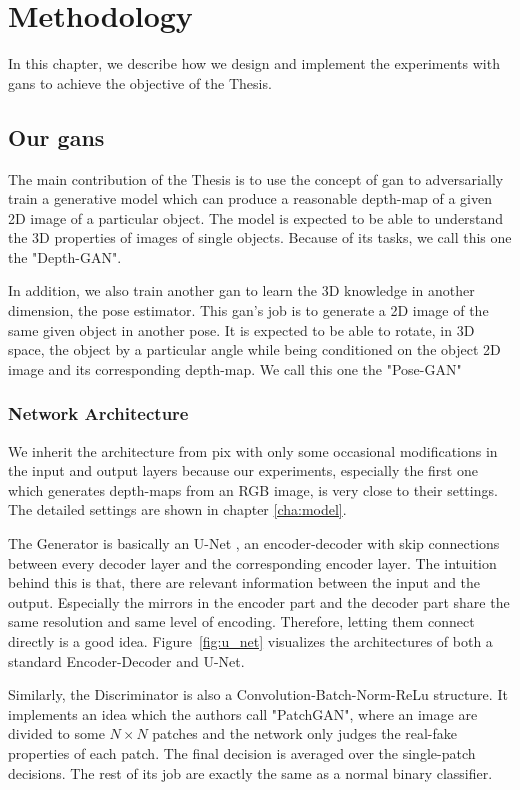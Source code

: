 \chapter{Methodology\label{cha:methodology}}
In this chapter, we describe how we design and implement the experiments with
\acrshort{gan}s to achieve the objective of the Thesis.

\section{Our \acrshort{gan}s }
The main contribution of the Thesis is to use the concept of \acrshort{gan} to
adversarially train a generative model which can produce a reasonable depth-map of a
given 2D image of a particular object. The model is expected to be able to
understand the 3D properties of images of single objects. Because of its tasks, we call
this one the "Depth-GAN".

In addition, we also train another \acrshort{gan} to learn the 3D knowledge in another
dimension, the pose estimator. This \acrshort{gan}'s job is to generate a 2D image of the
same given object in another pose. It is expected to be able to rotate, in 3D space, the
object by a particular angle while being conditioned on the object 2D image and its
corresponding depth-map. We call this one the "Pose-GAN"

\subsection{Network Architecture}

We inherit the architecture from \acrshort{pix} with only some occasional modifications in
the input and output layers because our experiments, especially the first one which
generates depth-maps from an RGB image, is very close to their settings. The detailed
settings are shown in chapter \ref{cha:model}.

The Generator is basically an U-Net \cite{u_net}, an encoder-decoder with skip
connections between every decoder layer and the corresponding encoder layer. The intuition
behind this is that, there are relevant information between the input and the output.
Especially the mirrors in the encoder part and the decoder part share the same resolution
and same level of encoding. Therefore, letting them connect directly is a good idea.
Figure~\ref{fig:u_net} visualizes the architectures of both a standard Encoder-Decoder and
U-Net.

Similarly, the Discriminator is also a Convolution-Batch-Norm-ReLu structure. It
implements an idea which the authors call "PatchGAN", where an image are divided to some
$N \times N$ patches and the network only judges the real-fake properties of each patch.
The final decision is averaged over the single-patch decisions. The rest of its job are
exactly the same as a normal binary classifier.

